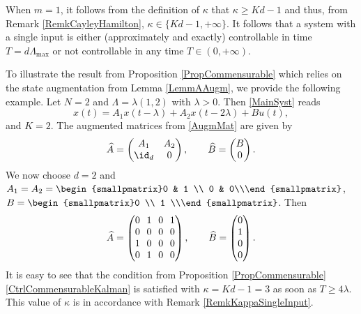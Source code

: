 \begin{remk}
\label{RemkKappaSingleInput}
When $m = 1$, it follows from the definition of $\kappa$ that $\kappa \geq K d - 1$ and thus, from Remark \ref{RemkCayleyHamilton}, $\kappa \in \{K d - 1, +\infty\}$. It follows that a system with a single input is either (approximately and exactly) controllable in time $T = d \Lambda_{\max}$ or not controllable in any time $T \in (0, +\infty)$.
\end{remk}

\begin{expl}
To illustrate the result from Proposition \ref{PropCommensurable} which relies on the state augmentation from Lemma \ref{LemmAAugm}, we provide the following example. Let $N = 2$ and $\Lambda = \lambda(1, 2)$ with $\lambda > 0$. Then \eqref{MainSyst} reads
\[x(t) = A_1 x(t - \lambda) + A_2 x(t - 2 \lambda) + B u(t),\]
and $K = 2$. The augmented matrices from \eqref{AugmMat} are given by
\[
\widehat A =
\begin{pmatrix}
A_1 & A_2 \\
\id_d & 0 \\
\end{pmatrix}, \qquad \widehat B =
\begin{pmatrix}
B \\ 0 \\
\end{pmatrix}.
\]
We now choose $d = 2$ and $A_1 = A_2 = \begin{smallpmatrix}0 & 1 \\ 0 & 0\\\end{smallpmatrix}$, $B = \begin{smallpmatrix}0 \\ 1 \\\end{smallpmatrix}$. Then
\[\arraycolsep3.5pt
\widehat A =
\begin{pmatrix}
0 & 1 & 0 & 1 \\
0 & 0 & 0 & 0 \\
1 & 0 & 0 & 0 \\
0 & 1 & 0 & 0 \\
\end{pmatrix}, \qquad \widehat B =
\begin{pmatrix}
0 \\
1 \\
0 \\
0 \\
\end{pmatrix}.
\]
It is easy to see that the condition from Proposition \ref{PropCommensurable}\eqref{CtrlCommensurableKalman} is satisfied with $\kappa = K d - 1 = 3$ as soon as $T \geq 4 \lambda$. This value of $\kappa$ is in accordance with Remark \ref{RemkKappaSingleInput}.
\end{expl}

